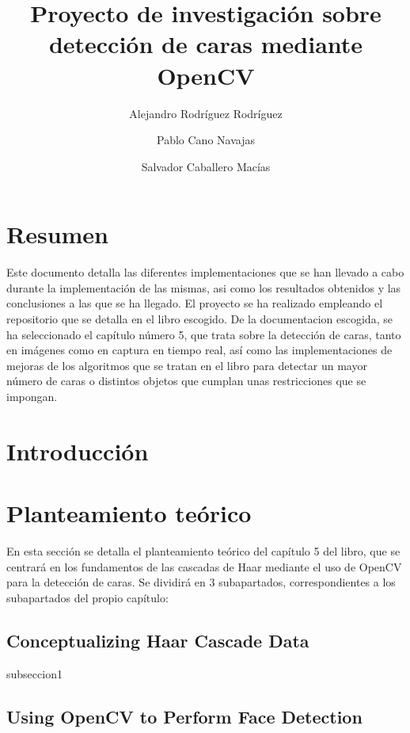 \documentclass[a4paper]{article}
\title{Proyecto de investigación sobre detección de caras mediante OpenCV}
\author{Alejandro Rodríguez Rodríguez \and Pablo Cano Navajas \and Salvador Caballero Macías}
\begin{document}
\maketitle

\newpage
\tableofcontents

\newpage
\section*{Resumen}

Este documento detalla las diferentes implementaciones que se han llevado a cabo durante la implementación de las mismas, asi como los resultados obtenidos y las conclusiones a las que se ha llegado. El proyecto se ha realizado empleando el repositorio\cite{1} que se detalla en el libro escogido\cite{2}.
De la documentacion escogida, se ha seleccionado el capítulo número 5, que trata sobre la detección de caras, tanto en imágenes como en captura en tiempo real, así como las implementaciones de mejoras de los algoritmos que se tratan en el libro para detectar un mayor número de caras o distintos objetos que cumplan unas restricciones que se impongan.

\section{Introducción}

\section{Planteamiento teórico}

En esta sección se detalla el planteamiento teórico del capítulo 5 del libro\cite{2}, que se centrará en los fundamentos de las cascadas de Haar mediante el uso de OpenCV para la detección de caras. Se dividirá en 3 subapartados, correspondientes a los subapartados del propio capítulo:

\subsection{Conceptualizing Haar Cascade Data}

subseccion1

\subsection{Using OpenCV to Perform Face Detection}
\end{document}
